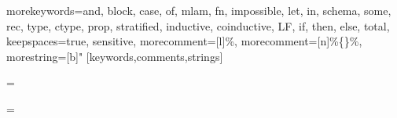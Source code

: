 \usepackage{xspace}
\usepackage{listings}


{
  morekeywords={and, block, case, of, mlam, fn, impossible, let, in, schema,
    some, rec, type, ctype, prop, stratified, inductive, coinductive, LF, if, then,
    else, total},
  keepspaces=true,
  sensitive,
  morecomment=[l]{\%},
  morecomment=[n]{\%\{}{\}\%},
  morestring=[b]"
}[keywords,comments,strings]

\lstset{language=ContextualML}

\newdimen\zzlistingsize
\newdimen\zzlistingsizedefault
\zzlistingsizedefault=10pt
\zzlistingsize=\zzlistingsizedefault
\global\def\CommentCopter{0}
\newcommand{\Lstbasicstyle}{\fontsize{\zzlistingsize}{1.05\zzlistingsize}\ttfamily%
}
\newcommand{\keywordcopter}{\fontsize{0.95\zzlistingsize}{1.0\zzlistingsize}\bf}
\newcommand{\stupidcopter}{\if0\CommentCopter\keywordcopter\fi}
\newcommand{\commentcopter}{\def\CommentCopter{1}\fontsize{0.95\zzlistingsize}{1.0\zzlistingsize}\rmfamily\slshape}

\newcommand{\caret}{\char94}

\newcommand{\LST}{\setlistingsize{\zzlistingsizedefault}}

\newlength{\zzlstwidth}
\newcommand{\setlistingsize}[1]{\zzlistingsize=#1%
\settowidth{\zzlstwidth}{{\Lstbasicstyle~}}%
}
\setlistingsize{\zzlistingsizedefault}

